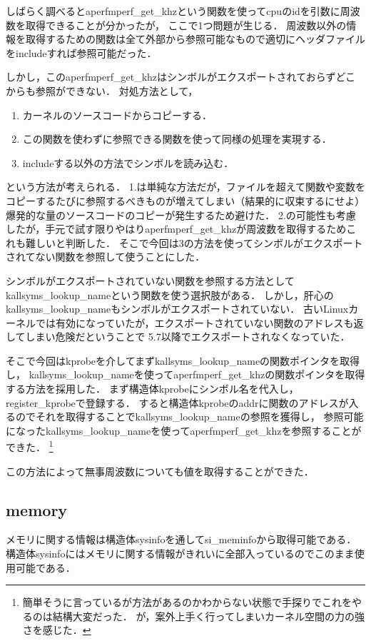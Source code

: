 しばらく調べるとaperfmperf_get_khzという関数を使ってcpuのidを引数に周波数を取得できる\cite{aperf}ことが分かったが，
ここで1つ問題が生じる．
周波数以外の情報を取得するための関数は全て外部から参照可能なもので適切にヘッダファイルをincludeすれば参照可能だった．

しかし，このaperfmperf_get_khzはシンボルがエクスポートされておらずどこからも参照ができない．
対処方法として，
\begin{enumerate}
    \item カーネルのソースコードからコピーする．
    \item この関数を使わずに参照できる関数を使って同様の処理を実現する．
    \item includeする以外の方法でシンボルを読み込む．
\end{enumerate}

という方法が考えられる．
1.は単純な方法だが，ファイルを超えて関数や変数をコピーするたびに参照するべきものが増えてしまい（結果的に収束するにせよ）
爆発的な量のソースコードのコピーが発生するため避けた．
2.の可能性も考慮したが，手元で試す限りやはりaperfmperf_get_khzが周波数を取得するためこれも難しいと判断した．
そこで今回は3の方法を使ってシンボルがエクスポートされてない関数を参照して使うことにした．

シンボルがエクスポートされていない関数を参照する方法としてkallsyms_lookup_nameという関数を使う選択肢がある．
しかし，肝心のkallsyms_lookup_nameもシンボルがエクスポートされていない．
古いLinuxカーネルでは有効になっていたが，エクスポートされていない関数のアドレスも返してしまい危険だということで
5.7以降でエクスポートされなくなっていた．\cite{kallsyms}

そこで今回はkprobeを介してまずkallsyms_lookup_nameの関数ポインタを取得し，
kallsyms_lookup_nameを使ってaperfmperf_get_khzの関数ポインタを取得する方法を採用した．
まず構造体kprobeにシンボル名を代入し，register_kprobeで登録する．
すると構造体kprobeのaddrに関数のアドレスが入るのでそれを取得することでkallsyms_lookup_nameの参照を獲得し，
参照可能になったkallsyms_lookup_nameを使ってaperfmperf_get_khzを参照することができた．
\footnote{簡単そうに言っているが方法があるのかわからない状態で手探りでこれをやるのは結構大変だった．
が，案外上手く行ってしまいカーネル空間の力の強さを感じた．}

この方法によって無事周波数についても値を取得することができた．

\subsection{memory}
メモリに関する情報は構造体sysinfoを通してsi\_meminfoから取得可能である．\cite{meminfo}
構造体sysinfoにはメモリに関する情報がきれいに全部入っているのでこのまま使用可能である．

